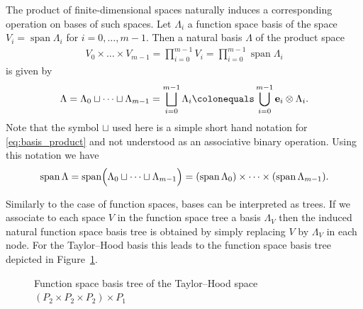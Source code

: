 \documentclass[a4paper,10pt,headings=normal,bibliography=totoc]{scrartcl}
\begin{document}
The product of finite-dimensional spaces naturally induces a corresponding operation on bases
of such spaces.
Let $\Lambda_i$ a function space basis of the space $V_i = \operatorname{span} \Lambda_i$
for $i=0,\dots,m-1$. Then a natural basis $\Lambda$ of the product space
\begin{align*}
  V_0 \times \dots \times V_{m-1}
  = \prod_{i=0}^{m-1} V_i
  = \prod_{i=0}^{m-1} \operatorname{span}\Lambda_i
\end{align*}
is given by
\begin{align}
  \label{eq:basis_product}
  \Lambda =
    \Lambda_0 \sqcup \dots \sqcup \Lambda_{m-1}
    = \bigsqcup_{i=0}^{m-1} \Lambda_i
    \colonequals \bigcup_{i=0}^{m-1} \mathbf{e}_i \otimes \Lambda_i.
\end{align}
Note that the symbol $\sqcup$ used here
is a simple short hand notation for \eqref{eq:basis_product}
and not understood as an associative binary operation.
Using this notation we have
\begin{align*}
  \operatorname{span} \Lambda
    = \operatorname{span} \Bigl( \Lambda_0 \sqcup \dots \sqcup \Lambda_{m-1} \Bigr)
    = (\operatorname{span} \Lambda_0) \times \dots \times (\operatorname{span} \Lambda_{m-1}).
\end{align*}

Similarly to the case of function spaces, bases can be interpreted as trees.
If we associate to each space $V$ in the function space tree a basis $\Lambda_V$
then the induced natural function space basis tree is obtained by simply replacing
$V$ by $\Lambda_V$ in each node. For the Taylor--Hood basis this leads to the
function space basis tree depicted in Figure~\ref{fig:taylor_hood_basis_tree}.

\begin{figure}
    \begin{center}
    \end{center}
    \caption{Function space basis tree of the Taylor--Hood space $(P_2 \times P_2 \times P_2)\times P_1$}
    \label{fig:taylor_hood_basis_tree}
\end{figure}
\end{document}

